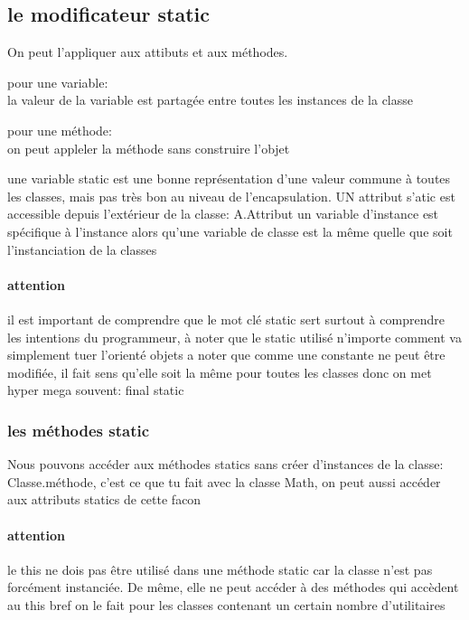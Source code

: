 \documentclass[a4paper,10pt]{article}
\begin{document}
\subsection{le modificateur static}
On peut l'appliquer aux attibuts et aux méthodes.
\begin{description}
 \item pour une variable:\\{la valeur de la variable est partagée entre toutes les instances de la classe}
 \item pour une méthode:\\{on peut appleler la méthode sans construire l'objet}
\end{description}
une variable static est une bonne représentation d'une valeur commune à toutes les classes, mais pas très bon au niveau de l'encapsulation.
\newline
UN attribut s'atic est accessible depuis l'extérieur de la classe: A.Attribut
\newline
un variable d'instance est spécifique à l'instance alors qu'une variable de classe est la même quelle que soit l'instanciation de la classes
\paragraph{attention}
il est important de comprendre que le mot clé static sert surtout à comprendre les intentions du programmeur, à noter que le static utilisé n'importe comment va simplement tuer l'orienté objets
\newline
a noter que comme une constante ne peut être modifiée, il fait sens qu'elle soit la même pour toutes les classes donc on met hyper mega souvent: final static
\subsubsection{les méthodes static}
Nous pouvons accéder aux méthodes statics sans créer d'instances de la classe: Classe.méthode, c'est ce que tu fait avec la classe Math, on peut aussi accéder aux attributs statics de cette facon
\paragraph{attention}
le this ne dois pas être utilisé dans une méthode static car la classe n'est pas forcément instanciée. De même, elle ne peut accéder à des méthodes qui accèdent au this
\newline
bref on le fait pour les classes contenant un certain nombre d'utilitaires
\end{document}
